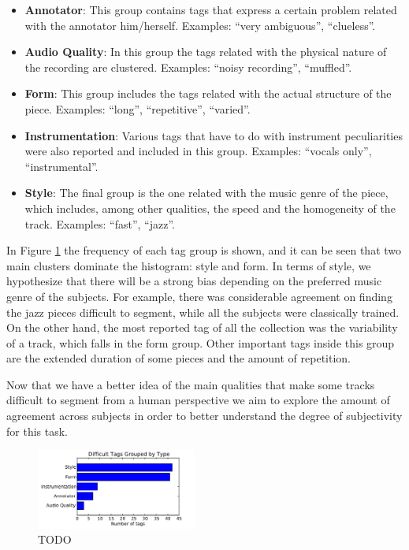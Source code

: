 \documentclass{article}
\begin{document}
\begin{itemize}
  \item
    \textbf{Annotator}: This group contains tags that express a certain problem related with the annotator him/herself. 
    Examples: ``very ambiguous'', ``clueless''.

  \item
    \textbf{Audio Quality}: In this group the tags related with the physical nature of the recording are clustered. 
    Examples: ``noisy recording'', ``muffled''.

  \item
    \textbf{Form}: This group includes the tags related with the actual structure of the piece. Examples: ``long'', ``repetitive'', ``varied''.

  \item
    \textbf{Instrumentation}: Various tags that have to do with instrument peculiarities were also reported and included in this group. Examples: ``vocals only'', ``instrumental''.

  \item
    \textbf{Style}: The final group is the one related with the music genre of the piece, which includes, among other qualities, the speed and the homogeneity of the track. Examples: ``fast'', ``jazz''.
\end{itemize}

In Figure \ref{fig:difficult-tags-type} the frequency of each tag group is shown, and it can be seen that two main clusters dominate the histogram: style and form.
In terms of style, we hypothesize that there will be a strong bias depending on the preferred music genre of the subjects.
For example, there was considerable agreement on finding the jazz pieces difficult to segment, while all the subjects were classically trained.
On the other hand, the most reported tag of all the collection was the variability of a track, which falls in the form group.
Other important tags inside this group are the extended duration of some pieces and the amount of repetition.

Now that we have a better idea of the main qualities that make some tracks difficult to segment from a human perspective we aim to explore the amount of agreement across subjects in order to better understand the degree of subjectivity for this task.


\begin{figure}
  \centering
  \includegraphics[width=0.47\textwidth]{plots/difficult-tags-type.pdf}
  \caption{TODO}
  \label{fig:difficult-tags-type}
\end{figure}%
\end{document}
